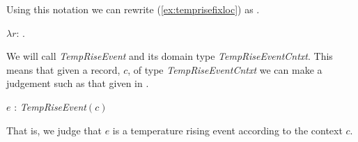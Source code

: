 %
% 
Using this notation we can rewrite (\ref{ex:temprisefixloc}) as
\nexteg{}.
\begin{ex} 
$\lambda r$: .\\  
\hspace*{2em} 
\label{ex:temprisespecfix}
\end{ex}
We will call \preveg{} \textit{TempRiseEvent} and its domain type
\textit{TempRiseEventCntxt}.  This means that given a record, $c$, of
type \textit{TempRiseEventCntxt} we can make a judgement such as that
given in \nexteg{}.
\begin{ex} 
$e$ : \textit{TempRiseEvent}$(c)$ 
\end{ex} 
That is, we judge that $e$ is a temperature rising event according to
the context $c$.  

